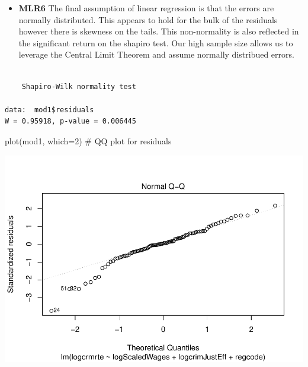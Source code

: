 \documentclass[]{article}
\newenvironment{Shaded}{}{}
\newcommand{\CommentTok}[1]{\textcolor[rgb]{0.00,0.50,0.00}{#1}}
\newcommand{\DataTypeTok}[1]{#1}
\newcommand{\DecValTok}[1]{#1}
\newcommand{\KeywordTok}[1]{\textcolor[rgb]{0.00,0.00,1.00}{#1}}
\newcommand{\NormalTok}[1]{#1}
\newcommand{\OperatorTok}[1]{#1}
\providecommand{\tightlist}{%
  \setlength{\itemsep}{0pt}\setlength{\parskip}{0pt}}
\begin{document}
\begin{itemize}
\tightlist
\item
  \textbf{MLR6} The final assumption of linear regression is that the
  errors are normally distributed. This appears to hold for the bulk of
  the residuals however there is skewness on the tails. This
  non-normality is also reflected in the significant return on the
  shapiro test. Our high sample size allows us to leverage the Central
  Limit Theorem and assume normally distribued errors.
\end{itemize}

\begin{Shaded}
\end{Shaded}

\begin{verbatim}

    Shapiro-Wilk normality test

data:  mod1$residuals
W = 0.95918, p-value = 0.006445
\end{verbatim}

\begin{Shaded}
\begin{Highlighting}[]
\KeywordTok{plot}\NormalTok{(mod1, }\DataTypeTok{which=}\DecValTok{2}\NormalTok{) }\CommentTok{# QQ plot for residuals}
\end{Highlighting}
\end{Shaded}

\includegraphics{Bagnard_Gaustad_Hartman_Leung_Lab_3_files/figure-latex/unnamed-chunk-64-1.pdf}
\end{document}
